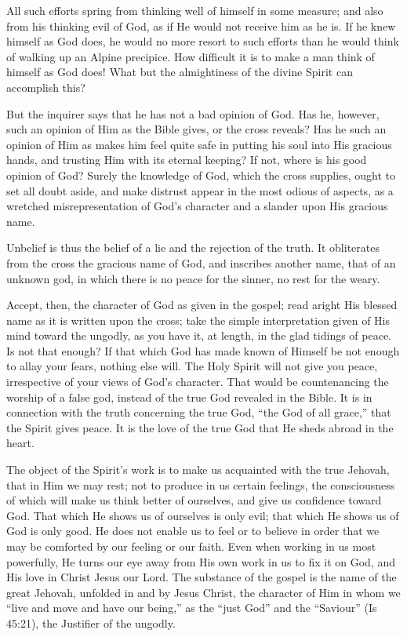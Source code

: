 \documentclass[
]{book}
\begin{document}
All such efforts spring from thinking well of himself in some measure; and also from his thinking evil of God, as if He would not receive him as he is. If he knew himself as God does, he would no more resort to such efforts than he would think of walking up an Alpine precipice. How difficult it is to make a man think of himself as God does! What but the almightiness of the divine Spirit can accomplish this?

But the inquirer says that he has not a bad opinion of God. Has he, however, such an opinion of Him as the Bible gives, or the cross reveals? Has he such an opinion of Him as makes him feel quite safe in putting his soul into His gracious hands, and trusting Him with its eternal keeping? If not, where is his good opinion of God? Surely the knowledge of God, which the cross supplies, ought to set all doubt aside, and make distrust appear in the most odious of aspects, as a wretched misrepresentation of God's character and a slander upon His gracious name.

Unbelief is thus the belief of a lie and the rejection of the truth. It obliterates from the cross the gracious name of God, and inscribes another name, that of an unknown god, in which there is no peace for the sinner, no rest for the weary.

Accept, then, the character of God as given in the gospel; read aright His blessed name as it is written upon the cross; take the simple interpretation given of His mind toward the ungodly, as you have it, at length, in the glad tidings of peace. Is not that enough? If that which God has made known of Himself be not enough to allay your fears, nothing else will. The Holy Spirit will not give you peace, irrespective of your views of God's character. That would be countenancing the worship of a false god, instead of the true God revealed in the Bible. It is in connection with the truth concerning the true God, ``the God of all grace,'' that the Spirit gives peace. It is the love of the true God that He sheds abroad in the heart.

The object of the Spirit's work is to make us acquainted with the true Jehovah, that in Him we may rest; not to produce in us certain feelings, the consciousness of which will make us think better of ourselves, and give us confidence toward God. That which He shows us of ourselves is only evil; that which He shows us of God is only good. He does not enable us to feel or to believe in order that we may be comforted by our feeling or our faith. Even when working in us most powerfully, He turns our eye away from His own work in us to fix it on God, and His love in Christ Jesus our Lord. The substance of the gospel is the name of the great Jehovah, unfolded in and by Jesus Christ, the character of Him in whom we ``live and move and have our being,'' as the ``just God'' and the ``Saviour'' (Is 45:21), the Justifier of the ungodly.
\end{document}
